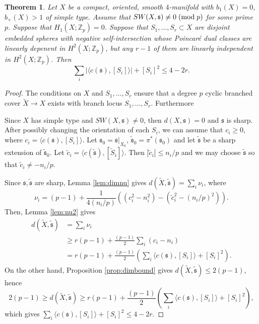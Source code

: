 \documentclass{amsart}
\newtheorem{theorem}{Theorem}[section]
\theoremstyle{definition}
\theoremstyle{remark}
\numberwithin{equation}{section}
\begin{document}
\begin{theorem}
Let $X$ be a compact, oriented, smooth $4$-manifold with $b_1(X) = 0$, $b_+(X) > 1$ of simple type. Assume that $SW(X , \mathfrak{s}) \neq 0 \; ({\rm mod} \; p)$ for some prime $p$. Suppose that $H_1(X ; \mathbb{Z}_p) = 0$. Suppose that $S_1, \dots , S_r \subset X$ are disjoint embedded spheres with negative self-intersection whose Poincar\'e dual classes are linearly depenent in $H^2(X ; \mathbb{Z}_p)$, but any $r-1$ of them are linearly independent in $H^2(X ; \mathbb{Z}_p)$. Then 
\[
\sum_i | \langle c(\mathfrak{s}) , [S_i] \rangle | + [S_i]^2 \le 4 - 2r.
\]
\end{theorem}
\begin{proof}
The conditions on $X$ and $S_1, \dots , S_r$ ensure that a degree $p$ cyclic branched cover $\widetilde{X} \to X$ exists with branch locus $S_1, \dots , S_r$. Furthermore

Since $X$ has simple type and $SW(X , \mathfrak{s}) \neq 0$, then $d(X , \mathfrak{s}) = 0$ and $\mathfrak{s}$ is sharp. After possibly changing the orientation of each $S_i$, we can assume that $c_i \ge 0$, where $c_i = \langle c(\mathfrak{s}) , [S_i] \rangle$. Let $\mathfrak{s}_0 = \mathfrak{s}|_{X_0}$, $\widetilde{\mathfrak{s}}_0 = \pi^*( \mathfrak{s}_0)$ and let $\widetilde{\mathfrak{s}}$ be a sharp extension of $\widetilde{\mathfrak{s}}_0$. Let $\widetilde{c}_i = \langle c(\widetilde{\mathfrak{s}}) , [\widetilde{S}_i] \rangle$. Then $| \widetilde{c}_i | \le n_i/p$ and we may choose $\widetilde{\mathfrak{s}}$ so that $\widetilde{c}_i \neq -n_i/p$.

Since $\mathfrak{s}, \widetilde{\mathfrak{s}}$ are sharp, Lemma \ref{lem:dimnu} gives $d(\widetilde{X} , \widetilde{\mathfrak{s}}) = \sum_i \nu_i$, where
\[
\nu_i = (p-1) + \frac{1}{4(n_i/p)}\left( (c_i^2 - n_i^2) - ( \widetilde{c}_i^2 - (n_i/p)^2 ) \right).
\]
Then, Lemma \ref{lem:nu2} gives
\begin{align*}
d(\widetilde{X} , \widetilde{\mathfrak{s}}) &= \sum_i \nu_i \\
& \ge r(p-1) + \frac{(p-1)}{2} \sum_i (c_i - n_i ) \\
&= r(p-1) + \frac{(p-1)}{2}\left( \sum_i \langle c(\mathfrak{s}) , [S_i] \rangle + [S_i]^2 \right).
\end{align*}
On the other hand, Proposition \ref{prop:dimbound} gives $d(\widetilde{X} , \widetilde{\mathfrak{s}}) \le 2(p-1)$, hence
\[
2(p-1) \ge d(\widetilde{X} , \widetilde{\mathfrak{s}}) \ge  r(p-1) + \frac{(p-1)}{2}\left( \sum_i \langle c(\mathfrak{s}) , [S_i] \rangle + [S_i]^2 \right),
\]
which gives $\sum_i \langle c(\mathfrak{s}) , [S_i] \rangle + [S_i]^2 \le 4-2r$.
\end{proof}
\end{document}
